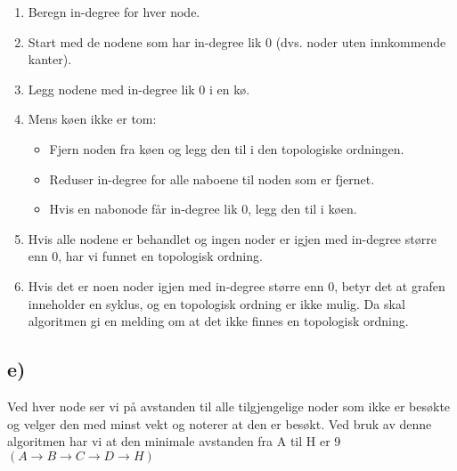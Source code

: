\documentclass[12pt]{article}
\begin{document}
\begin{enumerate}
    \item Beregn in-degree for hver node.
    \item Start med de nodene som har in-degree lik 0 (dvs. noder uten innkommende kanter).
    \item Legg nodene med in-degree lik 0 i en kø.
    \item Mens køen ikke er tom:
    \begin{itemize}
        \item Fjern noden fra køen og legg den til i den topologiske ordningen.
        \item Reduser in-degree for alle naboene til noden som er fjernet.
        \item Hvis en nabonode får in-degree lik 0, legg den til i køen.
    \end{itemize}
    \item Hvis alle nodene er behandlet og ingen noder er igjen med in-degree større enn 0, har vi funnet en topologisk ordning.
    \item Hvis det er noen noder igjen med in-degree større enn 0, betyr det at grafen inneholder en syklus, og en topologisk ordning er ikke mulig. Da skal algoritmen gi en melding om at det ikke finnes en topologisk ordning.
\end{enumerate}

\break
\subsection*{e)}
Ved hver node ser vi på avstanden til alle tilgjengelige noder som ikke er besøkte 
og velger den med minst vekt og noterer at den er besøkt. 
Ved bruk av denne algoritmen har vi at den minimale avstanden fra 
A til H er 9 \(\left(A\to B \to C \to D \to H\right)\)
\end{document}
